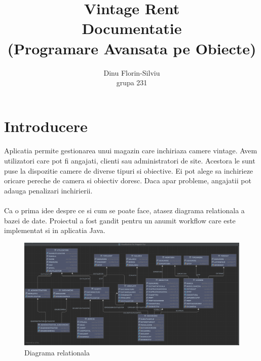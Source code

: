 \documentclass[oneside]{article}
\title{%
\textbf{Vintage Rent}  \\
\large Documentatie \\
(Programare Avansata pe Obiecte)}
\date{}
\author{Dinu Florin-Silviu \\ grupa 231}
\begin{document}
\maketitle
\tableofcontents

\newpage
{}

\section[Introducere]{Introducere}
\paragraph{} Aplicatia permite gestionarea unui magazin care inchiriaza camere vintage. Avem utilizatori care pot fi angajati, clienti sau administratori de site. Acestora le sunt puse la dispozitie camere de diverse tipuri si obiective. Ei pot alege sa inchirieze oricare pereche de camera si obiectiv doresc. Daca apar probleme, angajatii pot adauga penalizari inchirierii.

\paragraph{}Ca o prima idee despre ce si cum se poate face, atasez diagrama relationala a bazei de date. Proiectul a fost gandit pentru un anumit workflow care este implementat si in aplicatia Java.

\begin{figure}[ht]
    \centering
    \noindent\includegraphics[width=\linewidth]{diagrama.png}
    \caption{Diagrama relationala}
    \label{fig:diagrama}
\end{figure}
\end{document}
